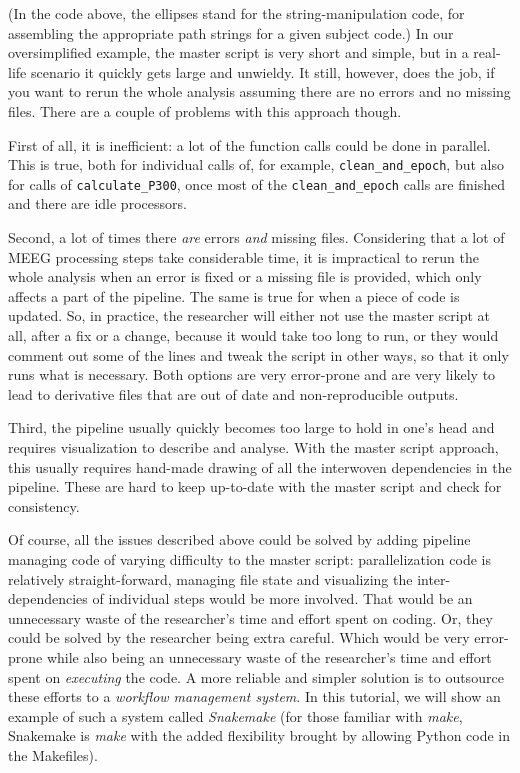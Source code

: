 \documentclass[a4paper,man,floatsintext,natbib]{apa6}
\begin{document}
(In the code above, the ellipses stand for the string-manipulation code, for assembling the appropriate path strings for a given subject code.) In our oversimplified example, the master script is very short and simple, but in a real-life scenario it quickly gets large and unwieldy. It still, however, does the job, if you want to rerun the whole analysis assuming there are no errors and no missing files. There are a couple of problems with this approach though.

First of all, it is inefficient: a lot of the function calls could be done in parallel. This is true, both for individual calls of, for example, \verb|clean_and_epoch|, but also for calls of \verb|calculate_P300|, once most of the \verb|clean_and_epoch| calls are finished and there are idle processors.

Second, a lot of times there \emph{are} errors \emph{and} missing files. Considering that a lot of MEEG processing steps take considerable time, it is impractical to rerun the whole analysis when an error is fixed or a missing file is provided, which only affects a part of the pipeline. The same is true for when a piece of code is updated. So, in practice, the researcher will either not use the master script at all, after a fix or a change, because it would take too long to run, or they would comment out some of the lines and tweak the script in other ways, so that it only runs what is necessary. Both options are very error-prone and are very likely to lead to derivative files that are out of date and non-reproducible outputs.

Third, the pipeline usually quickly becomes too large to hold in one's head and requires visualization to describe and analyse. With the master script approach, this usually requires hand-made drawing of all the interwoven dependencies in the pipeline. These are hard to keep up-to-date with the master script and check for consistency.

Of course, all the issues described above could be solved by adding pipeline managing code of varying difficulty to the master script: parallelization code is relatively straight-forward, managing file state and visualizing the inter-dependencies of individual steps would be more involved. That would be an unnecessary waste of the researcher's time and effort spent on coding. Or, they could be solved by the researcher being extra careful. Which would be very error-prone while also being  an unnecessary waste of the researcher's time and effort spent on \emph{executing} the code. A more reliable and simpler solution is to outsource these efforts to a \emph{workflow management system}. In this tutorial, we will show an example of such a system called \emph{Snakemake} (for those familiar with \emph{make}, Snakemake is \emph{make} with the added flexibility brought by allowing Python code in the Makefiles).
\end{document}
